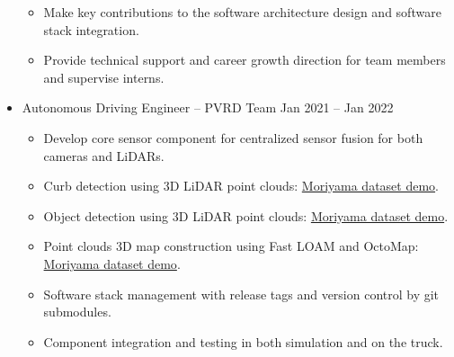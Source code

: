 \documentclass[a4paper,10pt,dvipdfmx]{article}
\begin{document}
\begin{itemize}[noitemsep,nolistsep]
\begin{itemize}[noitemsep,nolistsep]
      \item Make key contributions to the software architecture design and software stack integration.
      \item Provide technical support and career growth direction for team members and supervise interns.
    \end{itemize}
  \item[] Autonomous Driving Engineer -- PVRD Team \hfill Jan 2021 -- Jan 2022
    \begin{itemize}[noitemsep,nolistsep]
      \item Develop core sensor component for centralized sensor fusion for both cameras and LiDARs.
      \item Curb detection using 3D LiDAR point clouds: \href{https://youtu.be/ifXtkfOTIvU}{Moriyama dataset demo}.
      \item Object detection using 3D LiDAR point clouds: \href{https://youtu.be/fAb4NLzuoVs}{Moriyama dataset demo}.
      \item Point clouds 3D map construction using Fast LOAM and OctoMap: \href{https://youtu.be/j3xpDWPfBtw}{Moriyama dataset demo}.
      \item Software stack management with release tags and version control by git submodules.
      \item Component integration and testing in both simulation and on the truck.\\
    \end{itemize}
\end{itemize}
\end{document}
